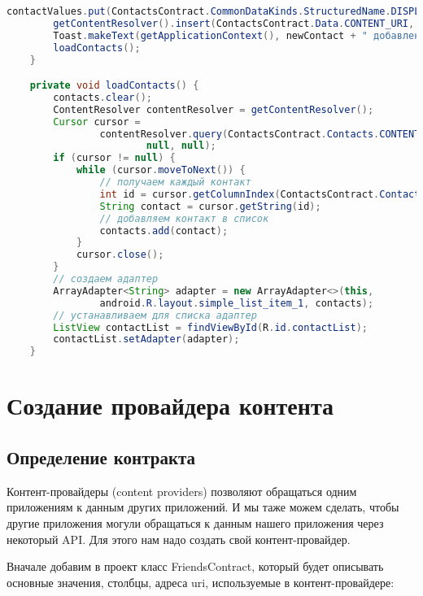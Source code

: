 \begin{lstlisting}[language=Java
	, label=lst:
	]
		contactValues.put(ContactsContract.CommonDataKinds.StructuredName.DISPLAY_NAME, newContact);
		getContentResolver().insert(ContactsContract.Data.CONTENT_URI, contactValues);
		Toast.makeText(getApplicationContext(), newContact + " добавлен в список контактов", Toast.LENGTH_LONG).show();
		loadContacts();
	}

	private void loadContacts() {
		contacts.clear();
		ContentResolver contentResolver = getContentResolver();
		Cursor cursor =
				contentResolver.query(ContactsContract.Contacts.CONTENT_URI, null, null,
						null, null);
		if (cursor != null) {
			while (cursor.moveToNext()) {
				// получаем каждый контакт
				int id = cursor.getColumnIndex(ContactsContract.Contacts.DISPLAY_NAME_PRIMARY);
				String contact = cursor.getString(id);
				// добавляем контакт в список
				contacts.add(contact);
			}
			cursor.close();
		}
		// создаем адаптер
		ArrayAdapter<String> adapter = new ArrayAdapter<>(this,
				android.R.layout.simple_list_item_1, contacts);
		// устанавливаем для списка адаптер
		ListView contactList = findViewById(R.id.contactList);
		contactList.setAdapter(adapter);
	}
\end{lstlisting}

\section{Создание провайдера контента}
\subsection{Определение контракта}
Контент-провайдеры (content providers) позволяют обращаться одним
приложениям к данным других приложений. И мы таже можем сделать,
чтобы другие приложения могули обращаться к данным нашего приложения
через некоторый API. Для этого нам надо создать свой контент-провайдер.\par
Вначале добавим в проект класс FriendsContract, который будет описывать
основные значения, столбцы, адреса uri, используемые в контент-провайдере:

